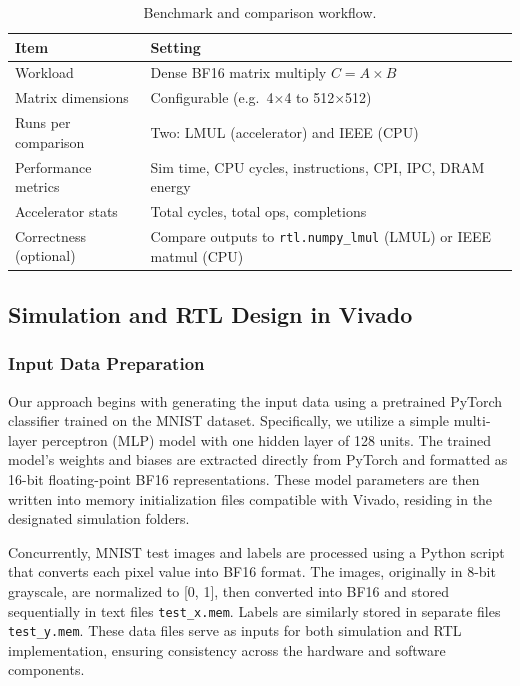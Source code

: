 \documentclass[12pt,letterpaper]{article}
\begin{document}
\begin{table}[H]
\centering
\caption{Benchmark and comparison workflow.}
\label{tab:gem5_workflow}
\begin{tabular}{@{}ll@{}}
\toprule
\textbf{Item} & \textbf{Setting} \\
\midrule
Workload & Dense BF16 matrix multiply $C = A \times B$ \\
Matrix dimensions & Configurable (e.g.\ 4$\times$4 to 512$\times$512) \\
Runs per comparison & Two: LMUL (accelerator) and IEEE (CPU) \\
Performance metrics & Sim time, CPU cycles, instructions, CPI, IPC, DRAM energy \\
Accelerator stats & Total cycles, total ops, completions \\
Correctness (optional) & Compare outputs to \texttt{rtl.numpy\_lmul} (LMUL) or IEEE matmul (CPU) \\
\bottomrule
\end{tabular}
\end{table}

\subsection{Simulation and RTL Design in Vivado}

\subsubsection{Input Data Preparation}  
Our approach begins with generating the input data using a pretrained PyTorch classifier trained on the MNIST dataset. Specifically, we utilize a simple multi-layer perceptron (MLP) model with one hidden layer of 128 units. The trained model's weights and biases are extracted directly from PyTorch and formatted as 16-bit floating-point BF16 representations. These model parameters are then written into memory initialization files compatible with Vivado, residing in the designated simulation folders.  

Concurrently, MNIST test images and labels are processed using a Python script that converts each pixel value into BF16 format. The images, originally in 8-bit grayscale, are normalized to [0, 1], then converted into BF16 and stored sequentially in text files \texttt{test\_x.mem}. Labels are similarly stored in separate files \texttt{test\_y.mem}. These data files serve as inputs for both simulation and RTL implementation, ensuring consistency across the hardware and software components.
\end{document}
